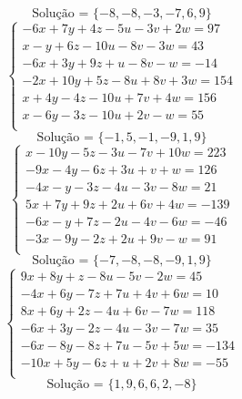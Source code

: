\documentclass[12pt,oneside,a4paper]{article}
\begin{document}
\begin{equation*}
\text{Solução = }\{-8,-8,-3,-7,6,9\}
\end{equation*}
\vspace{\baselineskip}
\begin{equation*}
\begin{cases}
-6x+7y+4z-5u-3v+2w=97 \\
x-y+6z-10u-8v-3w=43 \\
-6x+3y+9z+u-8v-w=-14 \\
-2x+10y+5z-8u+8v+3w=154 \\
x+4y-4z-10u+7v+4w=156 \\
x-6y-3z-10u+2v-w=55 \\
\end{cases}
\end{equation*}
\begin{equation*}
\text{Solução = }\{-1,5,-1,-9,1,9\}
\end{equation*}
\vspace{\baselineskip}
\begin{equation*}
\begin{cases}
x-10y-5z-3u-7v+10w=223 \\
-9x-4y-6z+3u+v+w=126 \\
-4x-y-3z-4u-3v-8w=21 \\
5x+7y+9z+2u+6v+4w=-139 \\
-6x-y+7z-2u-4v-6w=-46 \\
-3x-9y-2z+2u+9v-w=91 \\
\end{cases}
\end{equation*}
\begin{equation*}
\text{Solução = }\{-7,-8,-8,-9,1,9\}
\end{equation*}
\vspace{\baselineskip}
\begin{equation*}
\begin{cases}
9x+8y+z-8u-5v-2w=45 \\
-4x+6y-7z+7u+4v+6w=10 \\
8x+6y+2z-4u+6v-7w=118 \\
-6x+3y-2z-4u-3v-7w=35 \\
-6x-8y-8z+7u-5v+5w=-134 \\
-10x+5y-6z+u+2v+8w=-55 \\
\end{cases}
\end{equation*}
\begin{equation*}
\text{Solução = }\{1,9,6,6,2,-8\}
\end{equation*}
\end{document}
